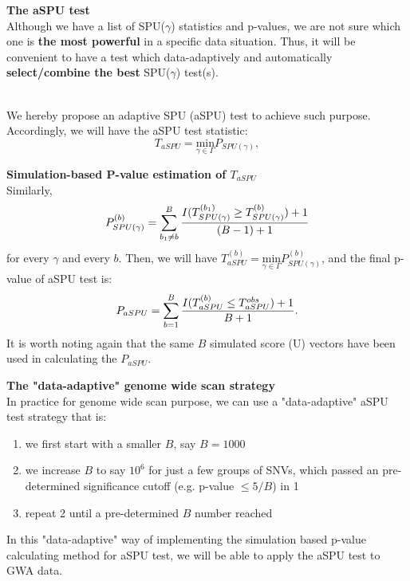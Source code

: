 \documentclass[compress]{beamer}
\begin{document}
\begin{frame}[allowframebreaks]
\framebreak
\textbf{The aSPU test}\\
Although we have a list of SPU($\gamma$) statistics and p-values, we are not sure which one is \textbf{the most powerful} in a specific data situation. Thus, it will be convenient to have a test which data-adaptively and automatically \textbf{select/combine the best} SPU($\gamma$) test(s).\\\

We hereby propose an adaptive SPU (aSPU) test to achieve such purpose. Accordingly, we will have the aSPU test statistic:
$$
T_{aSPU} = \underset{\gamma\in\Gamma}{ \textrm{min} } P_{ SPU(\gamma) },
$$

\framebreak
\textbf{Simulation-based P-value estimation of $T_{aSPU}$ }\\
Similarly,
$$
P^{ (b) }_{ SPU(\gamma) } =  \sum_{b_1 \neq b}^B { I(T^{ (b_1) }_{ SPU(\gamma) } \geq T^{ (b) }_{ SPU(\gamma) } ) + 1  \over (B-1) + 1 } 
$$
for every $\gamma$ and every $b$. Then, we will have $ 
T ^ {(b)} _{aSPU} = \underset{\gamma\in\Gamma}{ \textrm{min} } P^{ (b) }_{ SPU(\gamma) }
$, and the final p-value of aSPU test is:
$$
P_{aSPU} = \sum_{b=1}^B { I(T ^ {(b)} _{aSPU} \leq T ^ {obs} _{aSPU} ) + 1  \over B + 1 }.
$$
It is worth noting again that the same $B$ simulated score (U) vectors have been used in calculating the $P_{aSPU}$. 

\framebreak
\textbf{The "data-adaptive" genome wide scan strategy}\\
In practice for genome wide scan purpose, we can use a "data-adaptive" aSPU test strategy that is: 
\begin{enumerate}
\item we first start with a smaller $B$, say $B = 1000$
\item we increase $B$ to say $10^6$ for just a few groups of SNVs, which passed an pre-determined significance cutoff (e.g. p-value $ \leq 5/B$) in 1
\item repeat 2 until a pre-determined $B$ number reached 
\end{enumerate}
In this "data-adaptive" way of implementing the simulation based p-value calculating method for aSPU test, we will be able to apply the aSPU test to GWA data. 


\end{frame}
\end{document}
